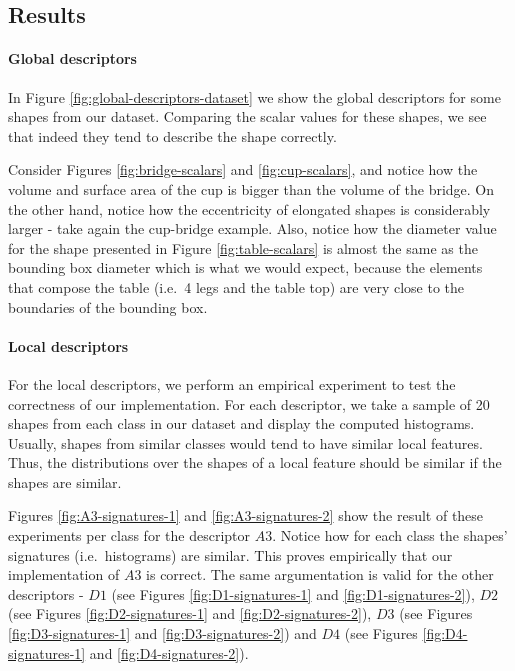 \subsection{Results}
\paragraph{Global descriptors}
In Figure \ref{fig:global-descriptors-dataset} we show the global descriptors for some shapes from our dataset.
Comparing the scalar values for these shapes, we see that indeed they tend to describe the shape correctly.

Consider Figures \ref{fig:bridge-scalars} and \ref{fig:cup-scalars}, and notice how the volume and surface area of the
cup is bigger than the volume of the bridge.
On the other hand, notice how the eccentricity of elongated shapes is considerably larger - take again the cup-bridge
example.
Also, notice how the diameter value for the shape presented in Figure \ref{fig:table-scalars} is almost the same as
the bounding box diameter which is what we would expect, because the elements that compose the table
(i.e.\ 4 legs and the table top) are very close to the boundaries of the bounding box.

\paragraph{Local descriptors}
For the local descriptors, we perform an empirical experiment to test the correctness of our implementation.
For each descriptor, we take a sample of 20 shapes from each class in our dataset and display the computed histograms.
Usually, shapes from similar classes would tend to have similar local features.
Thus, the distributions over the shapes of a local feature should be similar if the shapes are similar.

Figures \ref{fig:A3-signatures-1} and \ref{fig:A3-signatures-2} show the result of these experiments per class for the descriptor $A3$.
Notice how for each class the shapes' signatures (i.e.\ histograms) are similar.
This proves empirically that our implementation of $A3$ is correct.
The same argumentation is valid for the other descriptors - $D1$ (see Figures \ref{fig:D1-signatures-1} and
\ref{fig:D1-signatures-2}), $D2$ (see Figures \ref{fig:D2-signatures-1} and \ref{fig:D2-signatures-2}), $D3$ (see
Figures \ref{fig:D3-signatures-1} and \ref{fig:D3-signatures-2}) and $D4$ (see Figures \ref{fig:D4-signatures-1} and \ref{fig:D4-signatures-2}).

